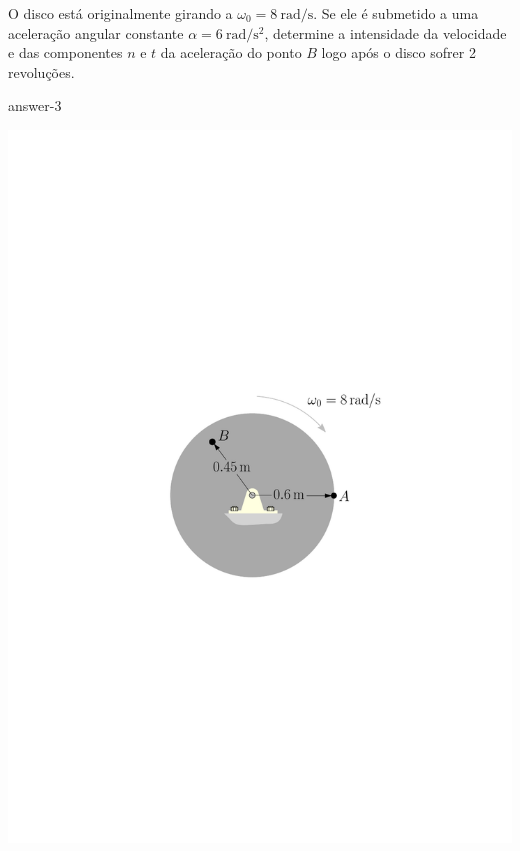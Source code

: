 \item O disco está originalmente girando a $\omega_{0}=\SI{8}{\radian/\second}$. Se ele é submetido a uma aceleração angular constante $\alpha=\SI{6}{\radian/\second^{2}}$, determine a intensidade da velocidade e das componentes $n$ e $t$ da aceleração do ponto $B$ logo após o disco sofrer 2 revoluções.

{answer-3}

\vspace{-2cm}
\begin{flushright}
	\includegraphics[scale=.75]{images/draw_8}
\end{flushright}